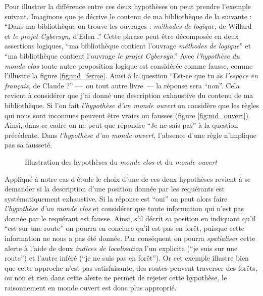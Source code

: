 Pour illustrer la différence entre ces deux hypothèses on peut prendre
l'exemple suivant. Imaginons que je décrive le contenu de ma
bibliothèque de la suivante : \enquote{Dans ma bibliothèque on trouve
  les ouvrages : \emph{méthodes de logique,} de Willard  et
  \emph{le projet \emph{Cybersyn},} d'Eden .} Cette phrase
peut être décomposée en deux assertions logiques, \enquote{ma
  bibliothèque contient l'ouvrage \emph{méthodes de logique}} et
\enquote{ma bibliothèque contient l'ouvrage \emph{le projet
    \emph{Cybersyn}}.} Avec \emph{l'hypothèse du monde clos} toute
autre proposition logique est considérée comme fausse, comme
l'illustre la figure \ref{fig:md_ferme}. Ainsi à la question
\enquote{Est-ce que tu as \emph{l'espace en français,} de Claude
   ?} ---~ou tout autre livre~--- la réponse sera
\enquote{non}. Cela revient à considérer que j'ai donné une
description exhaustive du contenu de ma bibliothèque. Si l'on fait
\emph{l'hypothèse d'un monde ouvert} on considère que les règles qui
nous sont inconnues peuvent être vraies ou fausses (figure
\ref{fig:md_ouvert}). Ainsi, dans ce cadre on ne peut que répondre
\enquote{Je ne sais pas} à la question précédente. Dans
\emph{l'hypothèse d'un monde ouvert,} l’absence d'une règle n'implique
pas sa fausseté.

\begin{figure}
  \centering
  \subfloat[]{
    
    \label{fig:md_ferme}
  }\hspace{2cm}
  \subfloat[]{
    
    \label{fig:md_ouvert}
  }
  \caption{Illustration des hypothèses du \emph{monde clos}
    \protect{} et du \emph{monde ouvert}
    \protect{}}
  \label{fig:comp_md}
\end{figure}

Appliqué à notre cas d'étude le choix d'une de ces deux hypothèses
revient à se demander si la description d'une position donnée par les
requérants est systématiquement exhaustive. Si la réponse est
\enquote{oui} on peut alors faire \emph{l'hypothèse d'un monde clos}
et considérer que toute information qui n'est pas donnée par le
requérant est fausse. Ainsi, s'il décrit sa position en indiquant
qu'il \enquote{est sur une route} on pourra en conclure qu'il est pas
en forêt, puisque cette information ne nous a pas été donnée. Par
conséquent on pourra \emph{spatialiser} cette alerte à l'aide de deux
\emph{indices de localisation} l'un explicite (\enquote{je suis sur
  une route}) et l'autre inféré (\enquote{je ne suis pas en
  forêt}). Or cet exemple illustre bien que cette approche n'est pas
satisfaisante, des routes peuvent traverser des forêts, ou non et rien
dans cette alerte ne permet de rejeter cette hypothèse, le
raisonnement en monde ouvert est donc plus approprié.

